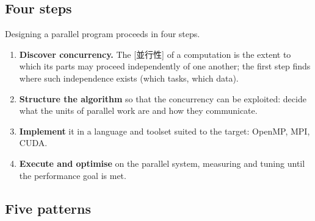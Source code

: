\documentclass[../main.tex]{subfiles}
\begin{document}
\subsection{Four steps}

Designing a parallel program proceeds in four steps.
\begin{enumerate}
  \item \textbf{Discover concurrency.}  The [並行性] of a
    computation is the extent to which its parts may proceed independently
    of one another; the first step finds where such independence exists
    (which tasks, which data).
  \item \textbf{Structure the algorithm} so that the concurrency can be
    exploited: decide what the units of parallel work are and how they
    communicate.
  \item \textbf{Implement} it in a language and toolset suited to the
    target: OpenMP, MPI, CUDA.
  \item \textbf{Execute and optimise} on the parallel system, measuring
    and tuning until the performance goal is met.
\end{enumerate}

\subsection{Five patterns}
\end{document}
